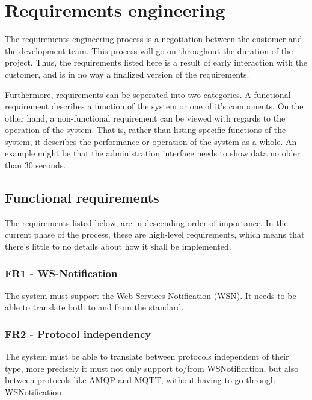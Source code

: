 
\chapter{Requirements engineering}

The requirements engineering process is a negotiation between the customer and the development team. This process will go on throughout the duration of the project. Thus, the requirements listed here is a result of early interaction with the customer, and is in no way a finalized version of the requirements.

Furthermore, requirements can be seperated into two categories. A functional requirement describes a function of the system or one of it's components. On the other hand, a non-functional requirement can be viewed with regards to the operation of the system. That is, rather than listing specific functions of the system, it describes the performance or operation of the system as a whole. An example might be that the administration interface needs to show data no older than 30 seconds.

\section{Functional requirements}

The requirements listed below, are in descending order of importance. In the current phase of the process, these are high-level requirements, which means that there's little to no details about how it shall be implemented.

\subsection{FR1 - WS-Notification}

The system must support the Web Services Notification (WSN). It needs to be able to translate both to and from the standard.

\subsection{FR2 - Protocol independency}

The system must be able to translate between protocols independent of their type, more precisely it must not only support to/from WSNotification, but also between protocols like AMQP and MQTT, without having to go through WSNotification.

